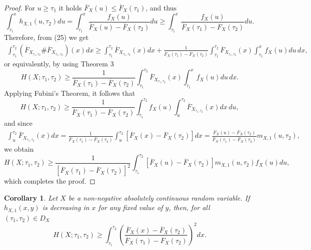 \documentclass[11pt]{article}
\newtheorem{corollary}{Corollary}
\begin{document}
\begin{proof}
	For $u \geq \tau_1$ it holds $\overline{F}_X(u) \leq \overline{F}_X(\tau_1)$, and thus
	$$ \textstyle \int_{\tau_1}^x h_{X,1}(u,\tau_2) du = \int_{\tau_1}^x \frac{f_X(u)}{\overline{F}_X(u) - \overline{F}_X(\tau_2)} du \geq \int_{\tau_1}^x \frac{f_X(u)}{\overline{F}_X(\tau_1) - \overline{F}_X(\tau_2)} du. $$
	Therefore, from (25) we get
	\begin{align*}
		\textstyle \int_{\tau_1}^{\tau_2} \left( \overline{F}_{X_{\tau_1,\tau_2}} \# \overline{F}_{X_{\tau_1,\tau_2}} \right)(x) dx \geq \int_{\tau_1}^{\tau_2} \overline{F}_{X_{\tau_1,\tau_2}}(x) dx + \frac{1}{\overline{F}_X(\tau_1) - \overline{F}_X(\tau_2)} \int_{\tau_1}^{\tau_2} \overline{F}_{X_{\tau_1,\tau_2}}(x) \int_{\tau_1}^x f_X(u) du \, dx,
	\end{align*}
	or equivalently, by using Theorem 3
	$$ \textstyle H(X;\tau_1,\tau_2) \geq \frac{1}{\overline{F}_X(\tau_1) - \overline{F}_X(\tau_2)} \int_{\tau_1}^{\tau_2} \overline{F}_{X_{\tau_1,\tau_2}}(x) \int_{\tau_1}^x f_X(u) du \, dx. $$
	Applying Fubini’s Theorem, it follows that
	$$ \textstyle H(X;\tau_1,\tau_2) \geq \frac{1}{\overline{F}_X(\tau_1) - \overline{F}_X(\tau_2)} \int_{\tau_1}^{\tau_2} f_X(u) \int_u^{\tau_2} \overline{F}_{X_{\tau_1,\tau_2}}(x) dx \, du, $$
	and since
	\begin{align*}
		\textstyle \int_u^{\tau_2} \overline{F}_{X_{\tau_1,\tau_2}}(x) dx = \textstyle \frac{1}{\overline{F}_X(\tau_1) - \overline{F}_X(\tau_2)} \int_u^{\tau_2} [\overline{F}_X(x) - \overline{F}_X(\tau_2)] dx = \textstyle \frac{\overline{F}_X(u) - \overline{F}_X(\tau_2)}{\overline{F}_X(\tau_1) - \overline{F}_X(\tau_2)} m_{X,1}(u,\tau_2),
	\end{align*}
	we obtain
	$$ \textstyle H(X;\tau_1,\tau_2) \geq \frac{1}{[\overline{F}_X(\tau_1) - \overline{F}_X(\tau_2)]^2} \int_{\tau_1}^{\tau_2} [\overline{F}_X(u) - \overline{F}_X(\tau_2)] m_{X,1}(u,\tau_2) f_X(u) du, $$
	which completes the proof.
\end{proof}

 
\begin{corollary}
	Let $X$ be a non-negative absolutely continuous random variable. If $h_{X,1}(x,y)$ is decreasing in $x$ for any fixed value of $y$, then, for all $(\tau_1,\tau_2)\in D_X$
	$$ \textstyle H(X;\tau_1,\tau_2) \geq \int_{\tau_1}^{\tau_2} \left( \frac{\overline{F}_X(x) - \overline{F}_X(\tau_2)}{\overline{F}_X(\tau_1) - \overline{F}_X(\tau_2)} \right)^2 dx. $$
\end{corollary}
\end{document}
